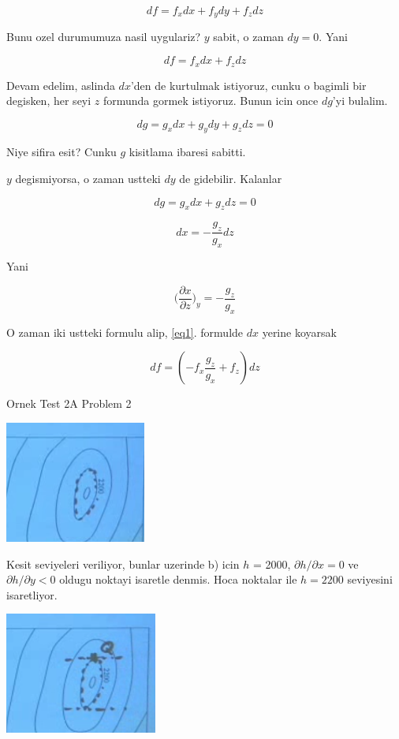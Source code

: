 \documentclass[12pt,fleqn]{article}\usepackage{../common}
\begin{document}
\[ df = f_xdx + f_ydy + f_zdz \]  

Bunu ozel durumumuza nasil uygulariz? $y$ sabit, o zaman $dy = 0$. Yani

\begin{equation}\label{eq1}
df = f_xdx + f_zdz  
\end{equation}

Devam edelim, aslinda $dx$'den de kurtulmak istiyoruz, cunku o bagimli bir
degisken, her seyi $z$ formunda gormek istiyoruz. Bunun icin once $dg$'yi
bulalim. 

\[ dg = g_xdx + g_ydy + g_zdz = 0   \]

Niye sifira esit? Cunku $g$ kisitlama ibaresi sabitti. 

$y$ degismiyorsa, o zaman ustteki $dy$ de gidebilir. Kalanlar

\[ dg = g_xdx + g_zdz = 0  \]

\[ dx = -\frac{g_z}{g_x}dz \]

Yani 

\[ 
\bigg( \frac{\partial x}{\partial z}\bigg)_{y} = -\frac{g_z}{g_x}
 \]

O zaman iki ustteki formulu alip, \ref{eq1}. formulde $dx$ yerine 
koyarsak

\[ df = (-f_x\frac{g_z}{g_x} +  f_z) dz \]

Ornek Test 2A Problem 2

\includegraphics[height=4cm]{15_2.png}

Kesit seviyeleri veriliyor, bunlar uzerinde b) icin $h$ = 2000, 
$\partial
h/\partial x = 0$ ve $\partial h/\partial y < 0$ oldugu noktayi isaretle denmis. Hoca 
noktalar ile $h=2200$ seviyesini isaretliyor. 

\includegraphics[height=4cm]{15_3.png}
\end{document}
